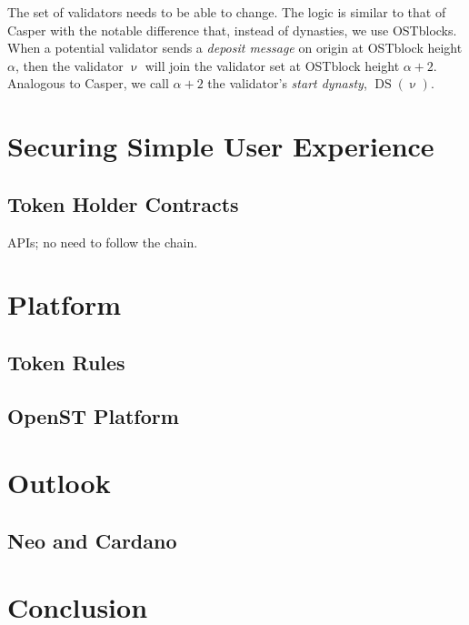 \documentclass[12pt,a4paper]{article}
\newcommand{\DS}{\operatorname{DS}}
\begin{document}
The set of validators needs to be able to change.
The logic is similar to that of Casper with the notable difference that, instead of dynasties, we use OSTblocks.
When a potential validator sends a \emph{deposit message} on origin at OSTblock height $\alpha$,
then the validator $\upnu$ will join the validator set at OSTblock height $\alpha+2$.
Analogous to Casper, we call $\alpha+2$ the validator's \emph{start dynasty}, $\DS(\upnu)$.



%
%
\section{Securing Simple User Experience}

\subsection{Token Holder Contracts}

APIs; no need to follow the chain.

%
%
\section{Platform}

\subsection{Token Rules}

\subsection{OpenST Platform}

%
%
\section{Outlook}

\subsection{Neo and Cardano}

%
%
\section{Conclusion}



\end{document}
